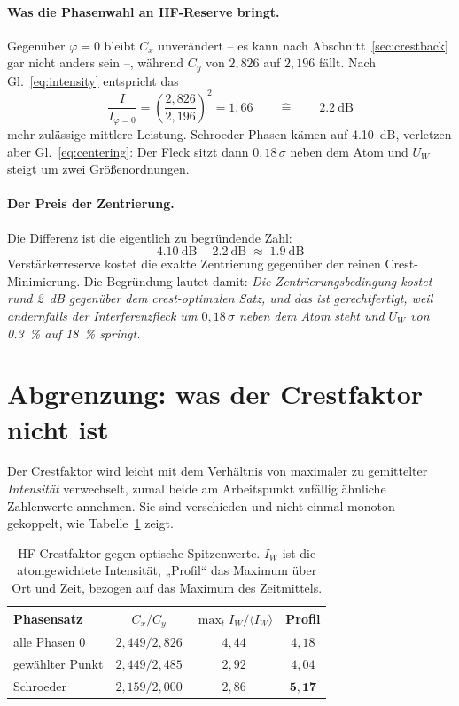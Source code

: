 \documentclass[11pt,a4paper]{article}
\newcommand{\crest}{\ensuremath{C}}
\newcommand{\Uw}{\ensuremath{U_W}}
\begin{document}
\paragraph{Was die Phasenwahl an HF-Reserve bringt.}
Gegenüber $\varphi=0$ bleibt $\crest_x$ unverändert -- es kann nach
Abschnitt~\ref{sec:crestback} gar nicht anders sein --, während $\crest_y$ von
$2{,}826$ auf $2{,}196$ fällt. Nach Gl.~\eqref{eq:intensity} entspricht das
\begin{equation}
  \frac{I}{I_{\varphi=0}}
  = \left(\frac{2{,}826}{2{,}196}\right)^{2} = 1{,}66
  \qquad\widehat{=}\qquad \SI{2.2}{\deci\bel}
\end{equation}
mehr zulässige mittlere Leistung. Schroeder-Phasen kämen auf
\SI{4.10}{\deci\bel}, verletzen aber Gl.~\eqref{eq:centering}: Der Fleck sitzt
dann $0{,}18\,\sigma$ neben dem Atom und $\Uw$ steigt um zwei
Größenordnungen.

\paragraph{Der Preis der Zentrierung.}
Die Differenz ist die eigentlich zu begründende Zahl:
\begin{equation}
  \SI{4.10}{\deci\bel} - \SI{2.2}{\deci\bel} \;\approx\; \SI{1.9}{\deci\bel}
\end{equation}
Verstärkerreserve kostet die exakte Zentrierung gegenüber der reinen
Crest-Minimierung. Die Begründung lautet damit: \emph{Die
Zentrierungsbedingung kostet rund \SI{2}{\deci\bel} gegenüber dem
crest-optimalen Satz, und das ist gerechtfertigt, weil andernfalls der
Interferenzfleck um $0{,}18\,\sigma$ neben dem Atom steht und $\Uw$ von
\SI{0.3}{\percent} auf \SI{18}{\percent} springt.}

\section{Abgrenzung: was der Crestfaktor nicht ist}\label{sec:abgrenzung}

Der Crestfaktor wird leicht mit dem Verhältnis von maximaler zu gemittelter
\emph{Intensität} verwechselt, zumal beide am Arbeitspunkt zufällig
ähnliche Zahlenwerte annehmen. Sie sind verschieden und nicht einmal monoton
gekoppelt, wie Tabelle~\ref{tab:abgrenzung} zeigt.

\begin{table}[htb]
  \centering
  \caption{HF-Crestfaktor gegen optische Spitzenwerte. $I_W$ ist die
  atomgewichtete Intensität, „Profil`` das Maximum über Ort und Zeit,
  bezogen auf das Maximum des Zeitmittels.}
  \label{tab:abgrenzung}
  \begin{tabular}{lccc}
    \toprule
    Phasensatz & $\crest_x/\crest_y$ & $\max_t I_W/\langle I_W\rangle$ & Profil\\
    \midrule
    alle Phasen $0$ & $2{,}449/2{,}826$ & $4{,}44$ & $4{,}18$\\
    gewählter Punkt & $2{,}449/2{,}485$ & $2{,}92$ & $4{,}04$\\
    Schroeder       & $2{,}159/2{,}000$ & $2{,}86$ & $\mathbf{5{,}17}$\\
    \bottomrule
  \end{tabular}
\end{table}
\end{document}
